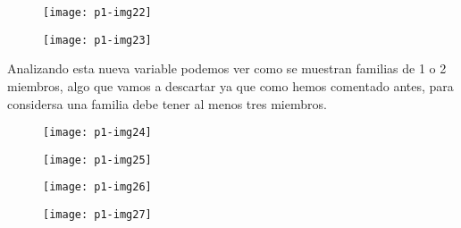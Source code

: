 \documentclass[10pt]{article}
\begin{document}
\begin{figure}[H]
	\begin{center}
 		\texttt{[image: p1-img22]}
	\end{center} 
\end{figure}

\begin{figure}[H]
	\begin{center}
 		\texttt{[image: p1-img23]}
	\end{center} 
\end{figure} 


Analizando esta nueva variable podemos ver como se muestran familias de 1 o 2 miembros, algo que vamos a descartar ya que como hemos comentado antes, para considersa una familia debe tener al menos tres miembros. \\

\begin{figure}[H]
	\begin{center}
 		\texttt{[image: p1-img24]}
	\end{center} 
\end{figure} 

\begin{figure}[H]
	\begin{center}
 		\texttt{[image: p1-img25]}
	\end{center} 
\end{figure} 

\begin{figure}[H]
	\begin{center}
 		\texttt{[image: p1-img26]}
	\end{center} 
\end{figure} 

\begin{figure}[H]
	\begin{center}
 		\texttt{[image: p1-img27]}
	\end{center} 
\end{figure} 
\end{document}
